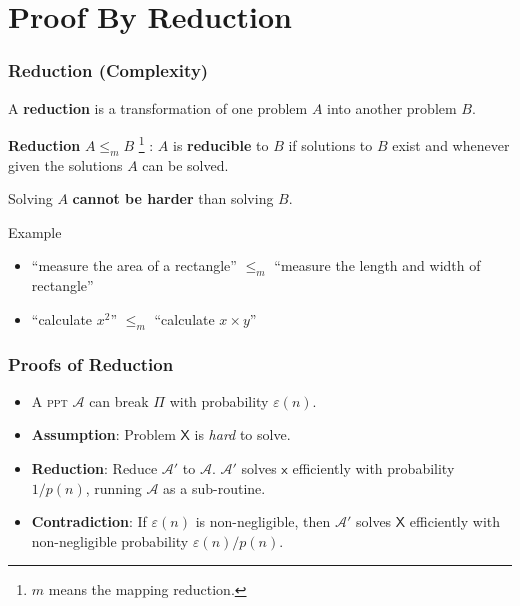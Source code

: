 \section{Proof By Reduction}
\begin{frame}\frametitle{Reduction (Complexity)}
A \textbf{reduction} is a transformation of one problem $A$ into another problem $B$.
\newline

\textbf{Reduction} $A \le_m B$ \footnote{$m$ means the mapping reduction.} : $A$ is \textbf{reducible} to $B$ if solutions to $B$ exist and whenever given the solutions $A$ can be solved. \newline

Solving $A$ \textbf{cannot be harder} than solving $B$.
\begin{exampleblock}{Example}
\begin{itemize}
\item ``measure the area of a rectangle'' $\le_m$ ``measure the length and width of rectangle''
\item ``calculate $x^2$'' $\le_m$ ``calculate $x \times y$''
\end{itemize}
\end{exampleblock}
\end{frame}
\begin{frame}\frametitle{Proofs of Reduction}
\begin{figure}
\begin{center}

\end{center}
\end{figure}
\begin{itemize}
\item A \textsc{ppt} $\mathcal{A}$ can break $\Pi$ with probability $\varepsilon(n)$.
\item \textbf{Assumption}: Problem $\mathsf{X}$ is \emph{hard} to solve.
\item \textbf{Reduction}: Reduce $\mathcal{A}'$ to $\mathcal{A}$. $\mathcal{A'}$ solves $\mathsf{x}$ efficiently with probability $1/p(n)$, running $\mathcal{A}$ as a sub-routine. 
\item \textbf{Contradiction}: If $\varepsilon(n)$ is non-negligible, then $\mathcal{A'}$ solves $\mathsf{X}$ efficiently with non-negligible probability $\varepsilon(n)/p(n)$.
\end{itemize}
\end{frame}

